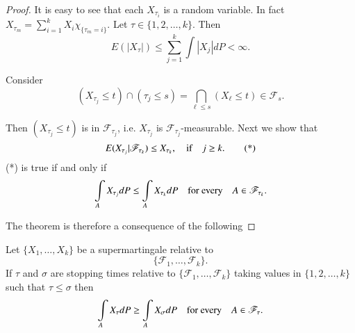 \begin{proof}
It is easy to see that each $X_{\tau_{i}}$ is a random variable. In
fact
$X_{\tau_{m}}=\sum\limits^{k}_{i=1}X_{i}\chi_{\{\tau_{m}=i\}}$. Let
$\tau\in \{1,2,\ldots,k\}$. Then
$$
E(|X_{\tau}|)\leq \sum\limits^{k}_{j=1}\int |X_{j}|dP<\infty.
$$

Consider
$$
(X_{\tau_{j}}\leq t)\cap (\tau_{j}\leq s)=\bigcap\limits_{\ell \leq
  s}(X_{\ell}\leq t)\in \mathscr{F}_{s}.
$$

Then $(X_{\tau_{j}}\leq t)$ is in $\mathscr{F}_{\tau_{j}}$, i.e.\@
$X_{\tau_{j}}$ is $\mathscr{F}_{\tau_{j}}$-measurable. Next we show
that
\begin{equation*}
E(X_{\tau_{j}}|\mathscr{F}_{\tau_{k}})\leq X_{\tau_{k}},\quad\text{if}\quad
j\geq k.\tag{*}
\end{equation*}
(*) is true if and only if
$$
\int\limits_{A}X_{\tau_{j}}dP\leq
\int\limits_{A}X_{\tau_{k}}dP\quad\text{for every}\quad A\in
\mathscr{F}_{\tau_{k}}. 
$$

The theorem is therefore a consequence of the following
\end{proof}

\begin{lemma*}
Let $\{X_{1},\ldots,X_{k}\}$ be a supermartingale relative to
$$
\{\mathscr{F}_{1},\ldots,\mathscr{F}_{k}\}.
$$ 
If $\tau$ and $\sigma$
are stopping times relative to
$\{\mathscr{F}_{1},\ldots,\mathscr{F}_{k}\}$ taking values in
$\{1,2,\ldots,k\}$ such that $\tau\leq \sigma$ then 
$$
\int\limits_{A}X_{\tau}dP\geq \int\limits_{A}X_{\sigma}dP\quad\text{for
  every}\quad A\in \mathscr{F}_{\tau}. 
$$
\end{lemma*}

